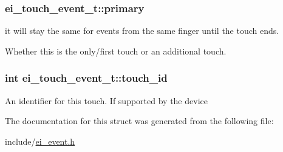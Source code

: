 \subsubsection[{\texorpdfstring{primary}{primary}}]{ ei\+\_\+touch\+\_\+event\+\_\+t\+::primary}\hypertarget{structei__touch__event__t_ad1ac5fff1b97acd2ef179412a753a517}{}\label{structei__touch__event__t_ad1ac5fff1b97acd2ef179412a753a517}


it will stay the same for events from the same finger until the touch ends. 

Whether this is the only/first touch or an additional touch. 
\subsubsection[{\texorpdfstring{touch\+\_\+id}{touch_id}}]{\setlength{\rightskip}{0pt plus 5cm}int ei\+\_\+touch\+\_\+event\+\_\+t\+::touch\+\_\+id}\hypertarget{structei__touch__event__t_a328a41ee9952d545b22c78047eaf09f6}{}\label{structei__touch__event__t_a328a41ee9952d545b22c78047eaf09f6}
An identifier for this touch. If supported by the device 

The documentation for this struct was generated from the following file\+:\begin{DoxyCompactItemize}
\item 
include/\hyperlink{ei__event_8h}{ei\+\_\+event.\+h}\end{DoxyCompactItemize}
